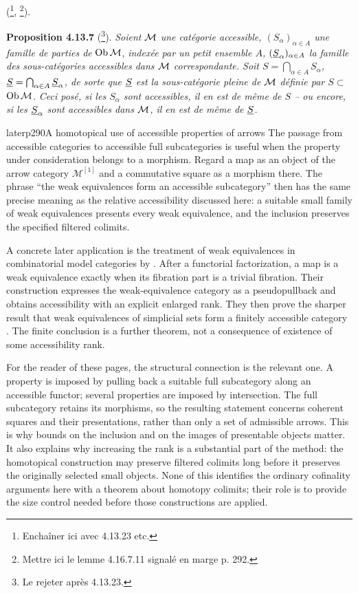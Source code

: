 (\footnote[119]{Enchaîner ici avec 4.13.23 etc.}, \footnote[120]{Mettre ici le lemme 4.16.7.11 signalé en marge p. 292.}).

\textbf{Proposition 4.13.7} (\footnote[121]{Le rejeter après 4.13.23.}). \textit{Soient $\mathcal{M}$ une catégorie accessible, $(S_\alpha)_{\alpha\in A}$ une famille de parties de} $\operatorname{Ob}\mathcal{M}$, \textit{indexée par un petit ensemble $A$, $(\underline{S}_\alpha)_{\alpha\in A}$ la famille des sous-catégories accessibles dans $\mathcal{M}$ correspondante. Soit $S = \bigcap_{\alpha\in A} S_\alpha$, $\underline{S} = \bigcap_{\alpha\in A} \underline{S}_\alpha$, de sorte que $\underline{S}$ est la sous-catégorie pleine de $\mathcal{M}$ définie par $S \subset$} $\operatorname{Ob}\mathcal{M}$. \textit{Ceci posé, si les $S_\alpha$ sont accessibles, il en est de même de $S$ – ou encore, si les $\underline{S}_\alpha$ sont accessibles dans $\mathcal{M}$, il en est de même de $\underline{S}$.}

\begin{dcomment}{later}{p290}{A homotopical use of accessible properties of arrows}
The passage from accessible categories to accessible full subcategories is useful when the property under consideration belongs to a morphism. Regard a map as an object of the arrow category $\mathcal M^{[1]}$ and a commutative square as a morphism there. The phrase ``the weak equivalences form an accessible subcategory'' then has the same precise meaning as the relative accessibility discussed here: a suitable small family of weak equivalences presents every weak equivalence, and the inclusion preserves the specified filtered colimits.

A concrete later application is the treatment of weak equivalences in combinatorial model categories by \citet[Section~2 and Proposition~2.2]{RaptisRosicky2015}. After a functorial factorization, a map is a weak equivalence exactly when its fibration part is a trivial fibration. Their construction expresses the weak-equivalence category as a pseudopullback and obtains accessibility with an explicit enlarged rank. They then prove the sharper result that weak equivalences of simplicial sets form a finitely accessible category \citep[Corollary~5.1]{RaptisRosicky2015}. The finite conclusion is a further theorem, not a consequence of existence of some accessibility rank.

For the reader of these pages, the structural connection is the relevant one. A property is imposed by pulling back a suitable full subcategory along an accessible functor; several properties are imposed by intersection. The full subcategory retains its morphisms, so the resulting statement concerns coherent squares and their presentations, rather than only a set of admissible arrows. This is why bounds on the inclusion and on the images of presentable objects matter. It also explains why increasing the rank is a substantial part of the method: the homotopical construction may preserve filtered colimits long before it preserves the originally selected small objects. None of this identifies the ordinary cofinality arguments here with a theorem about homotopy colimits; their role is to provide the size control needed before those constructions are applied.
\end{dcomment}



